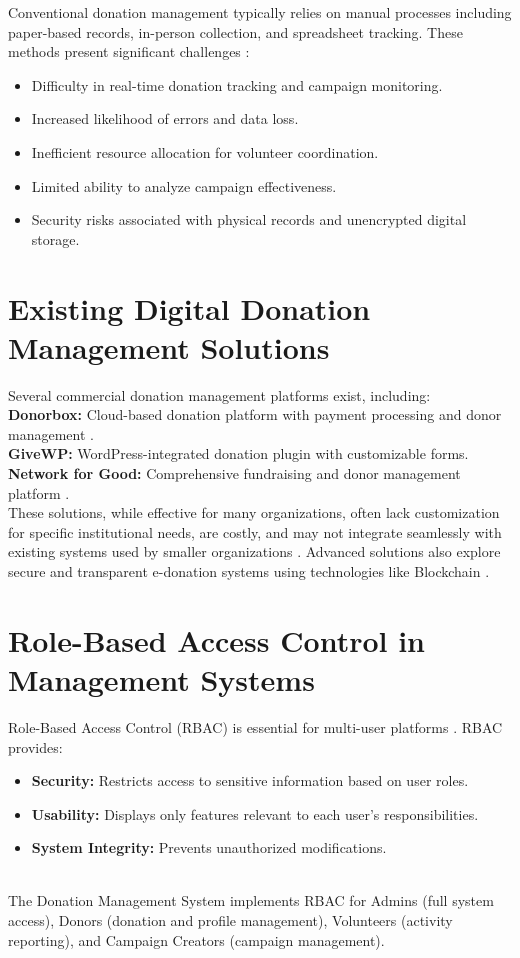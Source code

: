 Conventional donation management typically relies on manual processes including paper-based records, in-person collection, and spreadsheet tracking. These methods present significant challenges \cite{robinson2019digital}:
\begin{itemize}
    \item Difficulty in real-time donation tracking and campaign monitoring.
    \item Increased likelihood of errors and data loss.
    \item Inefficient resource allocation for volunteer coordination.
    \item Limited ability to analyze campaign effectiveness.
    \item Security risks associated with physical records and unencrypted digital storage.
\end{itemize}

\section{Existing Digital Donation Management Solutions}

Several commercial donation management platforms exist, including:
\\
\textbf{Donorbox:} Cloud-based donation platform with payment processing and donor management \cite{barnes2018rise}.
\\
\textbf{GiveWP:} WordPress-integrated donation plugin with customizable forms.
\\
\textbf{Network for Good:} Comprehensive fundraising and donor management platform \cite{schlegelmilch2022strategic}.
\\
These solutions, while effective for many organizations, often lack customization for specific institutional needs, are costly, and may not integrate seamlessly with existing systems used by smaller organizations \cite{sanchez2019framework}. Advanced solutions also explore secure and transparent e-donation systems using technologies like Blockchain \cite{huang2020online}.

\section{Role-Based Access Control in Management Systems}

Role-Based Access Control (RBAC) is essential for multi-user platforms \cite{sandhu1996rbac}. RBAC provides:
\begin{itemize}
    \item \textbf{Security:} Restricts access to sensitive information based on user roles.
    \item \textbf{Usability:} Displays only features relevant to each user's responsibilities.
    \item \textbf{System Integrity:} Prevents unauthorized modifications.
\end{itemize}
\\The Donation Management System implements RBAC for Admins (full system access), Donors (donation and profile management), Volunteers (activity reporting), and Campaign Creators (campaign management).

